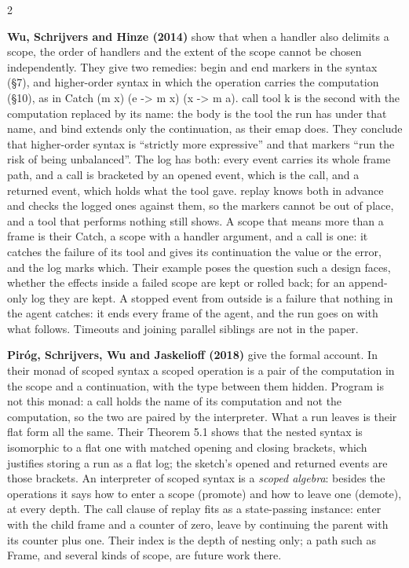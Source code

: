 \documentclass{article}
\newcommand{\paper}[1]{\par\smallskip\textbf{#1}\quad}
\newcommand{\cd}[1]{{\ttfamily #1}}
\begin{document}
\begin{multicols}{2}
\paper{Wu, Schrijvers and Hinze (2014)} show that when a handler also delimits a scope, the order
of handlers and the extent of the scope cannot be chosen independently. They give two remedies:
begin and end markers in the syntax (\S7), and higher-order syntax in which the operation carries
the computation (\S10), as in \cd{Catch (m x) (e -> m x) (x -> m a)}. \cd{call tool k} is the
second with the computation replaced by its name: the body is the tool the run has under that
name, and \cd{bind} extends only the continuation, as their \cd{emap} does. They conclude that higher-order syntax is ``strictly more expressive'' and that
markers ``run the risk of being unbalanced''. The log has both: every event carries its whole
frame path, and a call is bracketed by an \cd{opened} event, which is the call, and a
\cd{returned} event, which holds what the tool gave. \cd{replay} knows both in advance and
checks the logged ones against them, so the markers cannot be out of place, and a tool that
performs nothing still shows. A scope that means more than a frame is their \cd{Catch}, a
scope with a handler argument, and a \cd{call} is one: it catches the failure of its tool and
gives its continuation the value or the error, and the log marks which. Their example
poses the question such a design faces, whether the effects inside a failed scope are kept or
rolled back; for an append-only log they are kept. A \cd{stopped} event from outside is a failure
that nothing in the agent catches: it ends every frame of the agent, and the run goes on with
what follows. Timeouts and joining
parallel siblings are not in the paper.

\paper{Pir\'og, Schrijvers, Wu and Jaskelioff (2018)} give the formal account. In their monad of
scoped syntax a scoped operation is a pair of the computation in the scope and a continuation,
with the type between them hidden. \cd{Program} is not this monad: a \cd{call} holds the name of
its computation and not the computation, so the two are paired by the interpreter. What a run
leaves is their flat form all the same. Their Theorem 5.1 shows that the nested syntax is isomorphic to a flat one
with matched opening and closing brackets, which justifies storing a run as a flat log; the
sketch's \cd{opened} and \cd{returned} events are those brackets. An
interpreter of scoped syntax is a \emph{scoped algebra}: besides the operations it says how to
enter a scope (promote) and how to leave one (demote), at every depth. The \cd{call} clause of
\cd{replay} fits as a state-passing instance: enter with the child frame and a counter of zero,
leave by continuing the parent with its counter plus one. Their index is the depth of nesting
only; a path such as \cd{Frame}, and several kinds of scope, are future work there.


\end{multicols}
\end{document}
